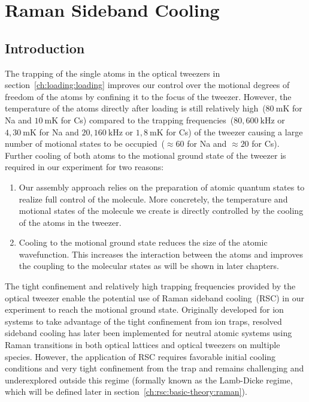 
\chapter{Raman Sideband Cooling}
\label{ch:rsc}

\section{Introduction}
\label{ch:rsc:introduction}

The trapping of the single atoms in the optical tweezers in section~\ref{ch:loading:loading}
improves our control over the motional degrees of freedom of the atoms
by confining it to the focus of the tweezer.
However, the temperature of the atoms directly after loading
is still relatively high~($80~\mathrm{mK}$ for Na and
$10~\mathrm{mK}$ for Cs)
compared to the trapping frequencies~($80,600~\mathrm{kHz}$ or $4,30~\mathrm{mK}$ for Na
and $20,160~\mathrm{kHz}$ or $1,8~\mathrm{mK}$ for Cs)
of the tweezer causing a large number of motional states
to be occupied~($\approx\!60$ for Na and $\approx\!20$ for Cs).
Further cooling of both atoms to the motional ground state of the tweezer
is required in our experiment for two reasons:
\begin{enumerate}
\item Our assembly approach relies on the preparation of atomic quantum states
  to realize full control of the molecule.
  More concretely, the temperature and motional states of the molecule we create
  is directly controlled by the cooling of the atoms in the tweezer.
\item Cooling to the motional ground state reduces the size of the atomic wavefunction.
  This increases the interaction between the atoms and
  improves the coupling to the molecular states as will be shown in later chapters.
\end{enumerate}

The tight confinement and relatively high trapping frequencies provided by the optical tweezer
enable the potential use of Raman sideband cooling~(RSC)
in our experiment to reach the motional ground state.
Originally developed for ion systems to take advantage of the tight confinement from ion traps,
resolved sideband cooling has later been implemented for neutral atomic systems
using Raman transitions in both optical lattices and optical tweezers
on multiple species.
However, the application of RSC requires favorable initial cooling conditions
and very tight confinement from the trap and remains challenging and underexplored
outside this regime (formally known as the Lamb-Dicke regime,
which will be defined later in section~\ref{ch:rsc:basic-theory:raman}).

